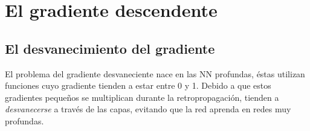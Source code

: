 \section{El gradiente descendente}%
\begin{comment}
El gradiente descendente busca los punto $p \in \Omega$ donde funciones del tipo $f: \Omega\subseteq\mathbb{R}^m \rightarrow \mathbb{R}$ alcanzan su mínimo. La idea de este método se basa en que si $f$ es una función diferenciable en todo su dominio $\Omega$, entonces la derivada de $f$ es un punto $p \in \Omega$ en dirección de un vector unitario $v \in \mathbb{R}^m$ se define como

$$ df_{p}(v) = \nabla f(p)v $$

Observe que la magnitud de la ecuación es
$$ |d f_{p}(v)| = ||\nabla f(p)|| ||v||\cos\theta = ||\nabla f(p)\cos\theta$$

Dicha magnitud es máxima cuando $\theta = 2n\pi, n \in \mathbb{Z}$. Es decir, para que $|df_{d}(v)|$ sea máxima, los vectores $\nabla f(p)$ y $v$ debe ser paralelo. De esta manera, la función $f$ crece más rápidamente en la dirección del vector $\nabla f(p)$ y decrece más rápidamente en la dirección del vectro $-\nabla f(p)$. Dicha situación sugiere que la dirección negativa del gradiente $-\nabla f(p)$ es una buena dirección de búsqueda para encontrar el minimizador de la función $f$.

Sea $f: \Omega \subseteq \mathbb{R} \rightarrow \mathbb{R}$, si $f$ tiene un mínimo en $p$, para encontrar a $p$ se construye una sucesión de punto $\{p_{t}\}$ tal que $p_{t}$ converge a $p$. Para resolver esto, comenzamos en $p_{t}$ y nos desplazamos una cantidad $-\lambda_{t}\nabla f(p_{t})$ para encontrar el punto $p_{t + 1}$ más cercano a $p$, es decir:
$$ p_{t + 1} =p_{t} - \lambda _{t}\nabla f(p_{t}) $$

donde $\lambda_{t}$ se selecciona de tal manera que $p_{t + 1} \in \Omega$ y $f(p_{t}) \geq f(p_{t + 1})$

El parámetro $\lambda_{t}$ se seleccionara para maximizar la cantidad a la que decrece la función $f$ en cada paso.
\end{comment}

\subsection{El desvanecimiento del gradiente}
El problema del gradiente desvaneciente nace en las NN profundas, éstas utilizan funciones cuyo gradiente tienden a estar entre 0 y 1. Debido a que estos gradientes pequeños se multiplican durante la retropropagación, tienden a {\em desvanecerse} a través de las capas, evitando que la red aprenda en redes muy profundas.

